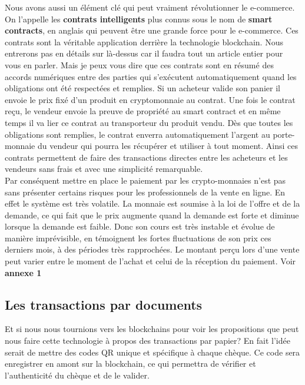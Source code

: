 \documentclass[12pt]{report}
\begin{document}
\hspace{1cm} \hspace{1cm} Nous avons aussi un élément clé qui peut vraiment révolutionner le e-commerce. On l'appelle les \textbf{ contrats intelligents} plus connus sous le nom de \textbf{smart contracts}, en anglais qui peuvent être une grande force pour le e-commerce. Ces contrats sont la véritable application derrière la technologie blockchain. Nous entrerons pas en détails sur là-dessus car il faudra tout un article entier pour vous en parler. Mais je peux vous dire que ces contrats sont en résumé des accords numériques entre des parties qui s'exécutent automatiquement quand les obligations ont été respectées et remplies. Si un acheteur valide son panier il envoie le prix fixé d'un produit en cryptomonnaie au contrat. Une fois le contrat reçu, le vendeur envoie la preuve de propriété  au smart contract et en même temps il va lier ce contrat au transporteur du produit vendu. Dès que toutes les obligations sont remplies, le contrat enverra automatiquement l'argent au porte-monnaie du vendeur qui pourra les récupérer et utiliser à tout moment. Ainsi ces contrats permettent de faire des transactions directes entre les acheteurs et les vendeurs sans frais et avec une simplicité remarquable.\\
    
\hspace{1cm}Par conséquent mettre en place le paiement par les crypto-monnaies n'est pas sans présenter certains risques pour les professionnels de la vente en ligne. En effet le système est très volatile. La monnaie est soumise à la loi de l'offre et de la demande, ce qui fait que le prix augmente quand la demande est forte et diminue lorsque la demande est faible. Donc son cours est très instable et évolue de manière imprévisible, en témoignent les fortes fluctuations de son prix ces derniers mois, à des périodes très rapprochées. Le montant perçu lors d'une vente peut varier entre le moment de l'achat et celui de la réception du paiement. Voir \textbf{annexe 1} \\


    \subsection{Les transactions par documents}
\hspace{1cm} Et si nous nous tournions vers les blockchains pour voir les propositions que peut nous faire cette technologie à propos des transactions par papier? En fait l'idée serait de mettre des codes QR unique et spécifique à chaque chèque. Ce code sera enregistrer en amont sur la blockchain, ce qui permettra de vérifier et l'authenticité du chèque et de le valider. \\
\end{document}
